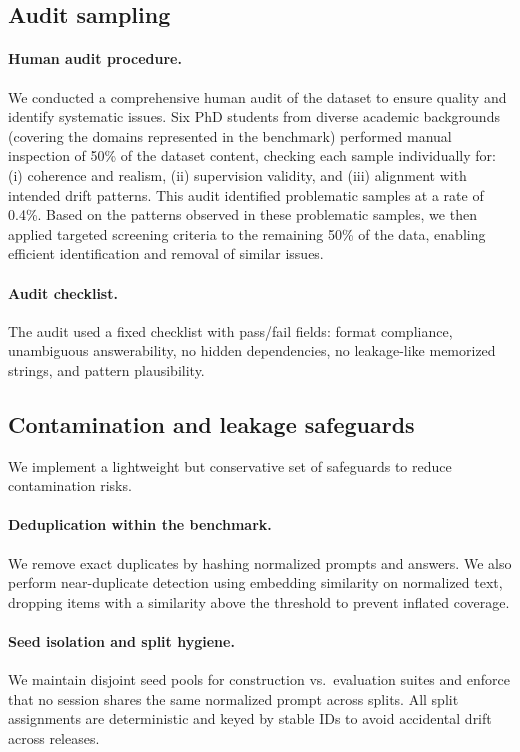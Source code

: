 \subsection{Audit sampling}
\label{app:data_quality_audit}

\paragraph{Human audit procedure.}
We conducted a comprehensive human audit of the dataset to ensure quality and identify systematic issues.
Six PhD students from diverse academic backgrounds (covering the domains represented in the benchmark) performed manual inspection of 50\% of the dataset content, checking each sample individually for: (i) coherence and realism, (ii) supervision validity, and (iii) alignment with intended drift patterns.
This audit identified problematic samples at a rate of 0.4\%.
Based on the patterns observed in these problematic samples, we then applied targeted screening criteria to the remaining 50\% of the data, enabling efficient identification and removal of similar issues.

\paragraph{Audit checklist.}
The audit used a fixed checklist with pass/fail fields: format compliance, unambiguous answerability, no hidden dependencies, no leakage-like memorized strings, and pattern plausibility.

\subsection{Contamination and leakage safeguards}
\label{app:data_quality_contamination}

We implement a lightweight but conservative set of safeguards to reduce contamination risks.

\paragraph{Deduplication within the benchmark.}
We remove exact duplicates by hashing normalized prompts and answers.
We also perform near-duplicate detection using embedding similarity on normalized text, dropping items with a similarity above the threshold to prevent inflated coverage.

\paragraph{Seed isolation and split hygiene.}
We maintain disjoint seed pools for construction vs.\ evaluation suites and enforce that no session shares the same normalized prompt across splits.
All split assignments are deterministic and keyed by stable IDs to avoid accidental drift across releases.

